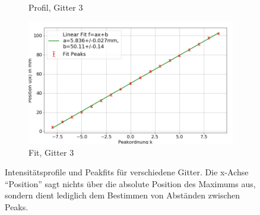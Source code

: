 \documentclass[
	a4paper,
	12pt,
	pagesize,
	ngerman
]{scrartcl}
\begin{document}
\begin{figure}[H]
\begin{subfigure}[b]{0.475\textwidth}
            \caption%
            {Profil, Gitter 3}
            \label{fig_2_profil_g3}
        \end{subfigure}
        \hfill
        \begin{subfigure}[b]{0.475\textwidth}
            \centering
            \includegraphics[width=\textwidth]{img/2/2_gitter_g3_fit}
            \caption[]%
            {Fit, Gitter 3}
            \label{fig_2_fit_g3}
        \end{subfigure}
        \caption%
        {
				Intensitätsprofile und Peakfits für verschiedene Gitter.
				Die x-Achse \enquote{Position} sagt nichts über die absolute Position des Maximums aus, sondern dient lediglich dem Bestimmen von Abständen zwischen Peaks.
				}
        \label{fig_2_mix_1}
    \end{figure}
\end{document}
